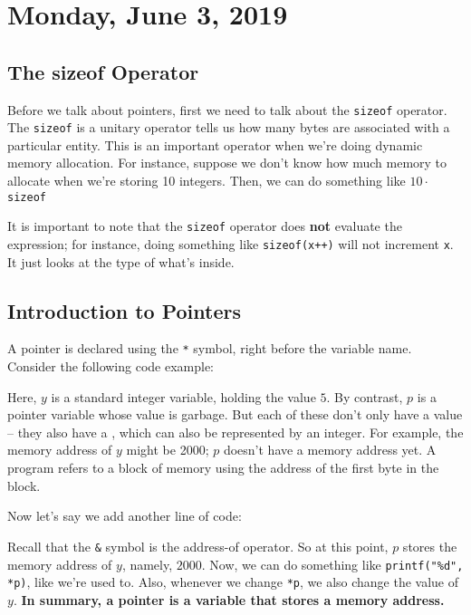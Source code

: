 \section{Monday, June 3, 2019}
\subsection{The sizeof Operator}

Before we talk about pointers, first we need to talk about the \verb!sizeof! operator. 
The \verb!sizeof! is a unitary operator tells us how many bytes are associated with a particular entity. This is an important operator when we're doing dynamic memory allocation. For instance, suppose we don't know how much memory to allocate when we're storing 10 integers. Then, we can do something like $10 \cdot$\verb!sizeof! 


It is important to note that the \verb!sizeof! operator does \textbf{not} evaluate the expression; for instance, doing something like \verb!sizeof(x++)! will not increment \verb!x!. It just looks at the type of what's inside. 


\subsection{Introduction to Pointers}
A pointer is declared using the \verb!*! symbol, right before the variable name. Consider the following code example:
\lstset{
caption=Pointers Example
}
\begin{center}

\end{center}

Here, $y$ is a standard integer variable, holding the value $5$. By contrast, $p$ is a pointer variable whose value is garbage. But each of these don't only have a value -- they also have a , which can also be represented by an integer. For example, the memory address of $y$ might be 2000; $p$ doesn't have a memory address yet. A program refers to a block of memory using the address of the first byte in the block.

Now let's say we add another line of code:



\lstset{
caption=Pointers Example
}
\begin{center}

\end{center}

Recall that the \verb!&! symbol is the address-of operator. So at this point, $p$ stores the memory address of $y$, namely, $2000.$ Now, we can do something like \verb!printf("%d", *p)!, like we're used to. Also, whenever we change \verb!*p!, we also change the value of $y$.
\textbf{In summary, a pointer is a variable that stores a memory address.}


